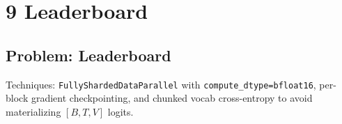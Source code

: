 \documentclass[11pt]{article}
\newcommand{\question}[1]{\subsection*{#1}}
\begin{document}
\section*{9 Leaderboard}

\question{Problem: Leaderboard}
Techniques: \texttt{FullyShardedDataParallel} with \texttt{compute\_dtype=bfloat16}, per-block gradient checkpointing, and chunked vocab cross-entropy to avoid materializing $[B,T,V]$ logits.

\begin{table}[H]
  \centering
  
  \caption{Best leaderboard timing ($2\times$B200, Modal).}
  \label{tab:leaderboard-8b}
\end{table}
\end{document}
